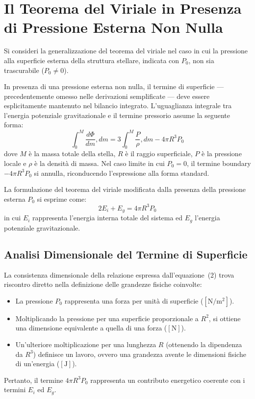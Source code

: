 \section{Il Teorema del Viriale in Presenza di Pressione Esterna Non Nulla}

Si consideri la generalizzazione del teorema del viriale nel caso in cui la pressione alla superficie esterna della struttura stellare, indicata con $P_0$, non sia trascurabile ($P_0 \neq 0$).

In presenza di una pressione esterna non nulla, il termine di superficie — precedentemente omesso nelle derivazioni semplificate — deve essere esplicitamente mantenuto nel bilancio integrato. L'uguaglianza integrale tra l'energia potenziale gravitazionale e il termine pressorio assume la seguente forma:
\begin{equation}
\int_0^M \frac{d\Phi}{dm} , dm = 3 \int_0^M \frac{P}{\rho} , dm - 4\pi R^3 P_0
\end{equation}
dove $M$ è la massa totale della stella, $R$ è il raggio superficiale, $P$ è la pressione locale e $\rho$ è la densità di massa. Nel caso limite in cui $P_0 = 0$, il termine boundary $-4\pi R^3 P_0$ si annulla, riconducendo l'espressione alla forma standard.

La formulazione del teorema del viriale modificata dalla presenza della pressione esterna $P_0$ si esprime come:
\begin{equation}
2 E_i + E_g = 4\pi R^3 P_0
\end{equation}
in cui $E_i$ rappresenta l'energia interna totale del sistema ed $E_g$ l'energia potenziale gravitazionale.

\subsection{Analisi Dimensionale del Termine di Superficie}
La consistenza dimensionale della relazione espressa dall'equazione~(2) trova riscontro diretto nella definizione delle grandezze fisiche coinvolte:
\begin{itemize}
\item La pressione $P_0$ rappresenta una forza per unità di superficie ($\left[\text{N}/\text{m}^2\right]$).
\item Moltiplicando la pressione per una superficie proporzionale a $R^2$, si ottiene una dimensione equivalente a quella di una forza ($\left[\text{N}\right]$).
\item Un'ulteriore moltiplicazione per una lunghezza $R$ (ottenendo la dipendenza da $R^3$) definisce un lavoro, ovvero una grandezza avente le dimensioni fisiche di un'energia ($\left[\text{J}\right]$).
\end{itemize}
Pertanto, il termine $4\pi R^3 P_0$ rappresenta un contributo energetico coerente con i termini $E_i$ ed $E_g$.

